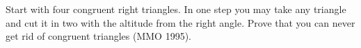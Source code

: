 Start with four congruent right triangles. In one step you may take any triangle and cut it in two with the altitude from the right angle. Prove that you can never get rid of congruent triangles (MMO 1995).
